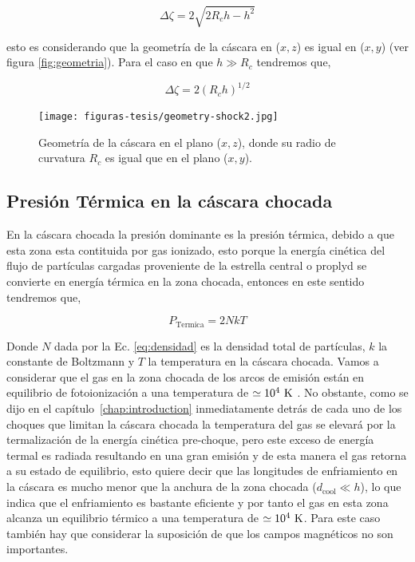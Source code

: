 \begin{equation}
  \label{eq:line-singht}
   \Delta \zeta = 2\sqrt{2R_{c}h -h^{2}}
\end{equation}

 esto es considerando que la geometría de la cáscara en (\(x, z\)) es igual en (\(x, y\)) (ver figura  \ref{fig:geometria}). Para el caso en que \(h \gg R_{c}\) tendremos que,

\begin{equation}
  \label{eq:vision}
  \Delta \zeta = 2(R_{c}h)^{1/2}
\end{equation}

\begin{figure}
  \centering
  \texttt{[image: figuras-tesis/geometry-shock2.jpg]}
  \caption{Geometría de la cáscara en el plano (\(x, z\)), donde su radio de curvatura \(R_{c}\) es igual que en el plano (\(x, y\)).}
  \label{fig:geometria1}
\end{figure}

\subsection{Presión Térmica en la cáscara chocada}
\label{sec:pressur-thermal}

En la cáscara chocada la presión dominante es la presión térmica, debido a que esta zona esta contituida por gas ionizado, esto porque la energía cinética del flujo de partículas cargadas proveniente de la estrella central o proplyd se convierte en energía térmica en la zona chocada, entonces en este sentido tendremos que,

\begin{equation}
  \label{eq:presion-cascara}
  P_{\text{Termica}} = 2 N k T 
\end{equation}
 
Donde \(N\) dada por la Ec. \ref{eq:densidad} es la densidad total de partículas, \(k\) la constante de Boltzmann y \(T\) la temperatura en la cáscara chocada. Vamos a considerar que el gas en la zona chocada de los arcos de emisión están en equilibrio de fotoionización a una temperatura  de  \(\simeq10^{4}~\mathrm{K}\) \citep{Henney:2002, Henney:2002a}. No obstante, como se dijo en el capítulo~\ref{chap:introduction} inmediatamente detrás de cada uno de los choques que limitan la cáscara chocada la temperatura del gas se elevará por la termalización de la energía cinética pre-choque, pero este exceso de energía termal es radiada resultando en  una gran emisión y de esta manera el gas retorna a su estado de equilibrio, esto quiere decir que las longitudes de enfriamiento en la cáscara es mucho menor que la anchura de la zona chocada (\(d_{\text{cool}} \ll h\)), lo que indica que el  enfriamiento es bastante  eficiente y por tanto el gas en esta zona alcanza un equilibrio térmico a una temperatura de  \(\simeq10^{4}~\mathrm{K}\). Para este caso también hay que considerar la suposición de que los campos magnéticos no son importantes.\\

